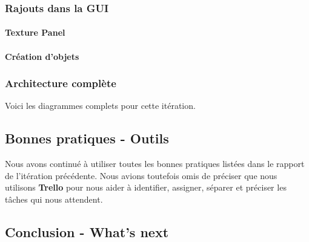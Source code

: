 	\subsubsection{Rajouts dans la GUI}

		\paragraph{Texture Panel}

		\paragraph{Création d'objets}

	\subsubsection{Architecture complète}
	Voici les diagrammes complets pour cette itération.


\subsection{Bonnes pratiques - Outils}

Nous avons continué à utiliser toutes les bonnes pratiques listées dans le
rapport de l'itération précédente. Nous avions toutefois omis de préciser que
nous utilisons \textbf{Trello} pour nous aider à identifier, assigner, séparer 
et préciser les tâches qui nous attendent. 

\subsection{Conclusion - What's next}

